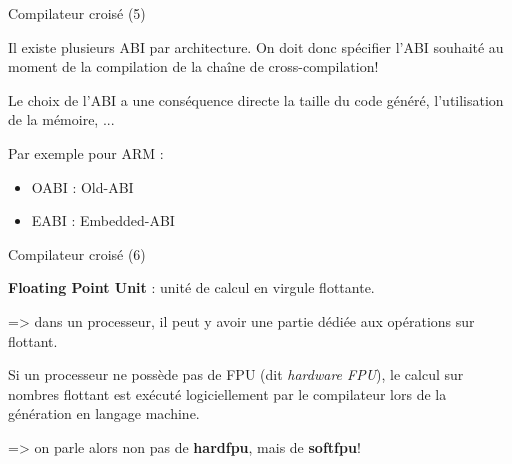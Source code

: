 \documentclass[12pt, t]{beamer}
\newcommand{\bi}{\begin{itemize}}
\newcommand{\ei}{\end{itemize}}
\begin{document}
\begin{frame}{Compilateur croisé (5)}

    \vspace{15pt}
    Il existe plusieurs ABI par architecture. On doit donc spécifier l'ABI
    souhaité au moment de la compilation de la chaîne de cross-compilation!

    {
        \vspace{15pt}
        Le choix de l'ABI a une conséquence directe la taille du code généré,
        l'utilisation de la mémoire, ...
    }

    {
        \vspace{15pt}
        Par exemple pour ARM :
        \bi
        \item OABI : Old-ABI
        \item EABI : Embedded-ABI
        \ei
    }
\end{frame}

\begin{frame}{Compilateur croisé (6)}

    \vspace{15pt}
    {\textbf{Floating Point Unit}} : unité de calcul en virgule flottante.

    \vspace{15pt}
    => dans un processeur, il peut y avoir une partie dédiée aux opérations
    sur flottant.

    {
        \vspace{15pt}
        Si un processeur ne possède pas de FPU (dit {\textit{hardware FPU}}),
        le calcul sur nombres flottant est exécuté logiciellement par le
        compilateur lors de la génération en langage machine.

        \vspace{15pt}
        => on parle alors non pas de {\textbf{hardfpu}}, mais de
        {\textbf{softfpu}}!
    }
\end{frame}
\end{document}
